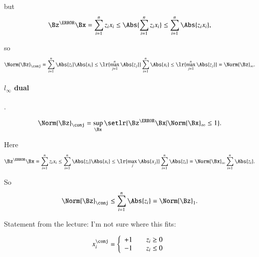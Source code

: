 but
\begin{dmath}\label{eqn:convex-optimizationLecture2:204}
\Bz^\T \Bx
=
\sum_{i=1}^n z_i x_i \le
\Abs{
\sum_{i=1}^n z_i x_i
}
\le
\sum_{i=1}^n \Abs{z_i x_i },
\end{dmath}

so
\begin{dmath}\label{eqn:convex-optimizationLecture2:224}
\Norm{\Bz}_\conj
=
\sum_{i=1}^n \Abs{z_i}\Abs{ x_i }
\le \lr{ \max_{j=1}^n \Abs{z_j} }
\sum_{i=1}^n \Abs{ x_i }
\le \lr{ \max_{j=1}^n \Abs{z_j} }
=
\Norm{\Bz}_\infty.
\end{dmath}


\paragraph{\( l_\infty \) dual}.


\begin{equation}\label{eqn:convex-optimizationLecture2:244}
\Norm{\Bz}_\conj
=
\sup_\Bx \setlr{ \Bz^\T \Bx | \Norm{\Bx}_\infty \le 1 }.
\end{equation}

Here
\begin{dmath}\label{eqn:convex-optimizationLecture2:264}
\Bz^\T \Bx
=
\sum_{i=1}^n z_i x_i
\le
\sum_{i=1}^n \Abs{z_i}\Abs{ x_i }
\le
\lr{ \max_j \Abs{ x_j } }
\sum_{i=1}^n \Abs{z_i}
=
\Norm{\Bx}_\infty
\sum_{i=1}^n \Abs{z_i}.
\end{dmath}

So
\begin{equation}\label{eqn:convex-optimizationLecture2:284}
\Norm{\Bz}_\conj
\le
\sum_{i=1}^n \Abs{z_i}
=
\Norm{\Bz}_1.
\end{equation}

Statement from the lecture: I'm not sure where this fits:

\begin{dmath}\label{eqn:convex-optimizationLecture2:304}
x_i^\conj
=
\left\{
\begin{array}{l l}
+1 & \quad \mbox{\( z_i \ge 0 \)} \\
-1 & \quad \mbox{\( z_i \le 0 \)}
\end{array}
\right.
\end{dmath}


